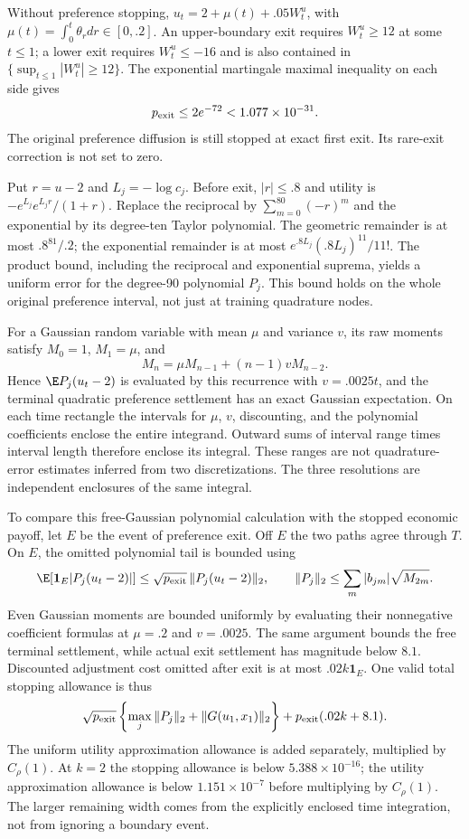 Without preference stopping, $u_t=2+\mu(t)+.05W_t^u$, with $\mu(t)=\int_0^t\theta_rdr\in[0,.2]$. An upper-boundary exit requires $W_t^u\geq12$ at some $t\leq1$; a lower exit requires $W_t^u\leq-16$ and is also contained in $\{\sup_{t\leq1}|W_t^u|\geq12\}$. The exponential martingale maximal inequality on each side gives
\[
 p_{\rm exit}\leq2e^{-72}<1.077\times10^{-31}.
\]
The original preference diffusion is still stopped at exact first exit. Its rare-exit correction is not set to zero.

Put $r=u-2$ and $L_j=-\log c_j$. Before exit, $|r|\leq.8$ and utility is $-e^{L_j}e^{L_jr}/(1+r)$. Replace the reciprocal by $\sum_{m=0}^{80}(-r)^m$ and the exponential by its degree-ten Taylor polynomial. The geometric remainder is at most $.8^{81}/.2$; the exponential remainder is at most $e^{.8L_j}(.8L_j)^{11}/11!$. The product bound, including the reciprocal and exponential suprema, yields a uniform error for the degree-90 polynomial $P_j$. This bound holds on the whole original preference interval, not just at training quadrature nodes.

For a Gaussian random variable with mean $\mu$ and variance $v$, its raw moments satisfy $M_0=1$, $M_1=\mu$, and
\[
 M_n=\mu M_{n-1}+(n-1)vM_{n-2}.
\]
Hence $\E P_j(u_t-2)$ is evaluated by this recurrence with $v=.0025t$, and the terminal quadratic preference settlement has an exact Gaussian expectation. On each time rectangle the intervals for $\mu$, $v$, discounting, and the polynomial coefficients enclose the entire integrand. Outward sums of interval range times interval length therefore enclose its integral. These ranges are not quadrature-error estimates inferred from two discretizations. The three resolutions are independent enclosures of the same integral.

To compare this free-Gaussian polynomial calculation with the stopped economic payoff, let $E$ be the event of preference exit. Off $E$ the two paths agree through $T$. On $E$, the omitted polynomial tail is bounded using
\[
 \E[\mathbf1_E|P_j(u_t-2)|]\leq\sqrt{p_{\rm exit}}\,
 \|P_j(u_t-2)\|_2,
 \qquad \|P_j\|_2\leq\sum_m|b_{jm}|\sqrt{M_{2m}}.
\]
Even Gaussian moments are bounded uniformly by evaluating their nonnegative coefficient formulas at $\mu=.2$ and $v=.0025$. The same argument bounds the free terminal settlement, while actual exit settlement has magnitude below $8.1$. Discounted adjustment cost omitted after exit is at most $.02k\mathbf1_E$. One valid total stopping allowance is thus
\[
 \sqrt{p_{\rm exit}}\left\{\max_j\|P_j\|_2+\|G(u_1,x_1)\|_2\right\}
       +p_{\rm exit}(.02k+8.1).
\]
The uniform utility approximation allowance is added separately, multiplied by $C_\rho(1)$. At $k=2$ the stopping allowance is below $5.388\times10^{-16}$; the utility approximation allowance is below $1.151\times10^{-7}$ before multiplying by $C_\rho(1)$. The larger remaining width comes from the explicitly enclosed time integration, not from ignoring a boundary event.

